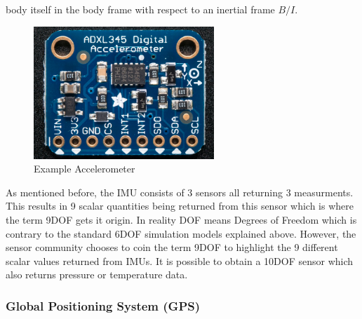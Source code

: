\documentclass{article}
\begin{document}
body itself in the body frame with respect to an inertial frame
$B/I$. 
\begin{figure}[H]
  \begin{center}
  \includegraphics[height=50mm]{Figures/Accelerometer}
  \end{center}
  \caption{Example Accelerometer \cite{qp36}}
\end{figure}
As mentioned before, the IMU consists of 3 sensors all returning 3 measurments. This results in 9 scalar quantities being returned from this sensor which is where the term 9DOF gets it origin. In reality DOF means Degrees of Freedom which is contrary to the standard 6DOF simulation models explained above. However, the sensor community chooses to coin the term 9DOF to highlight the 9 different scalar values returned from IMUs. It is possible to obtain a 10DOF sensor which also returns pressure or temperature data. 

\subsubsection{Global Positioning System (GPS)}
\end{document}
